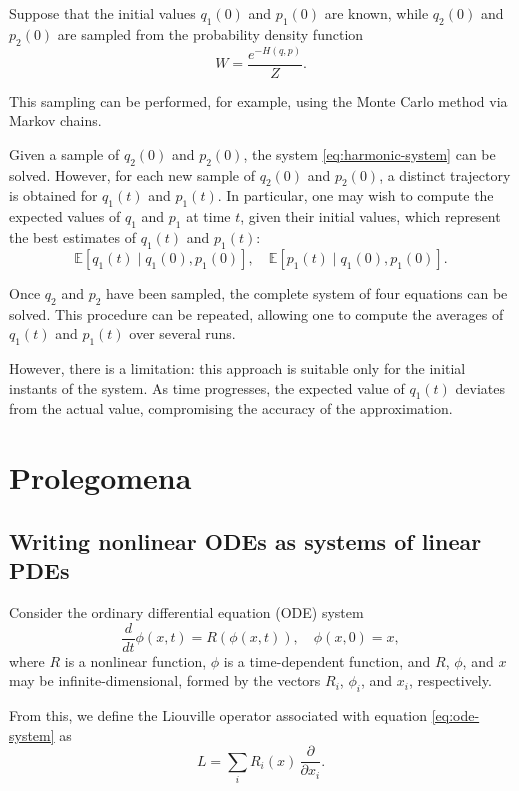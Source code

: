 \documentclass[12pt]{article}
\begin{document}
Suppose that the initial values $q_1(0)$ and $p_1(0)$ are known, while $q_2(0)$ and $p_2(0)$ are sampled from the probability density function
\begin{equation*}
	W = \frac{e^{-H(q,p)}}{Z}.
\end{equation*}

This sampling can be performed, for example, using the Monte Carlo method via Markov chains.

Given a sample of $q_2(0)$ and $p_2(0)$, the system \eqref{eq:harmonic-system} can be solved. However, for each new sample of $q_2(0)$ and $p_2(0)$, a distinct trajectory is obtained for $q_1(t)$ and $p_1(t)$. In particular, one may wish to compute the expected values of $q_1$ and $p_1$ at time $t$, given their initial values, which represent the best estimates of $q_1(t)$ and $p_1(t)$:
\begin{equation*}
	\mathbb{E}[q_1(t)\mid q_1(0), p_1(0)], \quad \mathbb{E}[p_1(t)\mid q_1(0), p_1(0)].
\end{equation*}

Once $q_2$ and $p_2$ have been sampled, the complete system of four equations can be solved. This procedure can be repeated, allowing one to compute the averages of $q_1(t)$ and $p_1(t)$ over several runs.

However, there is a limitation: this approach is suitable only for the initial instants of the system. As time progresses, the expected value of $q_1(t)$ deviates from the actual value, compromising the accuracy of the approximation.
\newpage


\section{Prolegomena}
\subsection{Writing nonlinear ODEs as systems of linear PDEs}

Consider the ordinary differential equation (ODE) system
\begin{equation}
	\frac{d}{dt} \phi(x,t) = R(\phi(x,t)), \quad \phi(x, 0) = x,
	\label{eq:ode-system}
\end{equation}
where $R$ is a nonlinear function, $\phi$ is a time-dependent function, and $R$, $\phi$, and $x$ may be infinite-dimensional, formed by the vectors $R_i$, $\phi_i$, and $x_i$, respectively.

From this, we define the Liouville operator associated with equation \eqref{eq:ode-system} as
\begin{equation}
	L = \sum_i R_i(x)\,\frac{\partial}{\partial x_i}.
	\label{eq:liouville-operator}
\end{equation}
\end{document}
